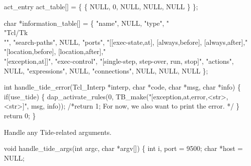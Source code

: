 
\nwenddocs{}\endmoddef
act_entry act_table[] =
\{ \{ NULL, 0, NULL, NULL, NULL \}
\};
\nwendcode{}\nwdocspar


\nwenddocs{}\endmoddef
char *information_table[] =
\{ "name",               NULL,
  "type",               "\\"Tcl/Tk\\"",
  "search-paths",       NULL,
  "ports",              "[[exec-state,at], [always,before], [always,after]," \\
                        "[location,before], [location,after]," \\
                        "[exception,at]]",
  "exec-control",       "[single-step, step-over, run, stop]",
  "actions",            NULL,
  "expressions",        NULL,
  "connections",        NULL,
  NULL,                 NULL
\};
\nwendcode{}\nwdocspar




\nwenddocs{}\endmoddef\let\nwnotused=\nwoutput{}
int handle_tide_error(Tcl_Interp *interp, char *code, char *msg, char *info)
\{
  if(use_tide) \{
    dap_activate_rules(0, TB_make("[exception,at,error,<str>,<str>]", msg, info));
    /*return 1; For now, we also want to print the error. */
  \}
  return 0;
\}
\nwendcode{}\nwdocspar


Handle any Tide-related arguments.

\nwenddocs{}\endmoddef\let\nwnotused=\nwoutput{}
void handle_tide_args(int argc, char *argv[])
\{
  int i, port = 9500;
  char *host = NULL; 

